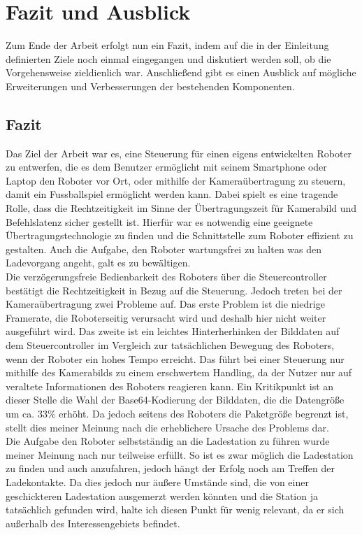 \chapter{Fazit und Ausblick}
\label{ch:fazit}

Zum Ende der Arbeit erfolgt nun ein Fazit, indem auf die in der Einleitung definierten Ziele noch einmal eingegangen und diskutiert werden soll, ob die Vorgehensweise zieldienlich war. Anschließend gibt es einen Ausblick auf mögliche Erweiterungen und Verbesserungen der bestehenden Komponenten.

\section{Fazit}
Das Ziel der Arbeit war es, eine Steuerung für einen eigens entwickelten Roboter zu entwerfen, die es dem Benutzer ermöglicht mit seinem Smartphone oder Laptop den Roboter vor Ort, oder mithilfe der Kameraübertragung zu steuern, damit ein Fussballspiel ermöglicht werden kann. Dabei spielt es eine tragende Rolle, dass die Rechtzeitigkeit im Sinne der Übertragungszeit für Kamerabild und Befehlslatenz sicher gestellt ist. Hierfür war es notwendig eine geeignete Übertragungstechnologie zu finden und die Schnittstelle zum Roboter effizient zu gestalten. Auch die Aufgabe, den Roboter wartungsfrei zu halten was den Ladevorgang angeht, galt es zu bewältigen. \\
Die verzögerungsfreie Bedienbarkeit des Roboters über die Steuercontroller bestätigt die Rechtzeitigkeit in Bezug auf die Steuerung. Jedoch treten bei der Kameraübertragung zwei Probleme auf. Das erste Problem ist die niedrige Framerate, die Roboterseitig verursacht wird und deshalb hier nicht weiter ausgeführt wird. Das zweite ist ein leichtes Hinterherhinken der Bilddaten auf dem Steuercontroller im Vergleich zur tatsächlichen Bewegung des Roboters, wenn der Roboter ein hohes Tempo erreicht. Das führt bei einer Steuerung nur mithilfe des Kamerabilds zu einem erschwertem Handling, da der Nutzer nur auf veraltete Informationen des Roboters reagieren kann. Ein Kritikpunkt ist an dieser Stelle die Wahl der Base64-Kodierung der Bilddaten, die die Datengröße um ca. 33\% erhöht. Da jedoch seitens des Roboters die Paketgröße begrenzt ist, stellt dies meiner Meinung nach die erheblichere Ursache des Problems dar. \\
Die Aufgabe den Roboter selbstständig an die Ladestation zu führen wurde meiner Meinung nach nur teilweise erfüllt. So ist es zwar möglich die Ladestation zu finden und auch anzufahren, jedoch hängt der Erfolg noch am Treffen der Ladekontakte. Da dies jedoch nur äußere Umstände sind, die von einer geschickteren Ladestation ausgemerzt werden könnten und die Station ja tatsächlich gefunden wird, halte ich diesen Punkt für wenig relevant, da er sich außerhalb des Interessengebiets befindet. \\
